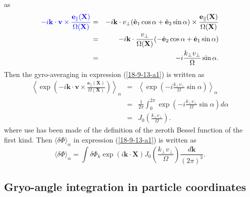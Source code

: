 \documentclass{article}
\newcommand{\tmcolor}[2]{{\color{#1}{#2}}}
\begin{document}
as
\begin{eqnarray}
  \tmcolor{blue}{- i\mathbf{k} \cdot \mathbf{v} \times
  \frac{\mathbf{e}_{\parallel} (\mathbf{X})}{\Omega (\mathbf{X})}} & = & -
  i\mathbf{k} \cdot v_{\perp} (\hat{\mathbf{e}}_1 \cos \alpha +
  \hat{\mathbf{e}}_2 \sin \alpha) \times \frac{\mathbf{e}_{\parallel}
  (\mathbf{X})}{\Omega (\mathbf{X})} \nonumber\\
  & = & - i\mathbf{k} \cdot \frac{v_{\perp}}{\Omega (\mathbf{X})} (-
  \hat{\mathbf{e}}_2 \cos \alpha + \hat{\mathbf{e}}_1 \sin \alpha) \nonumber\\
  & = & - i \frac{k_{\perp} v_{\perp}}{\Omega} \sin \alpha . 
  \label{18-9-12-e6}
\end{eqnarray}
Then the gyro-averaging in expression (\ref{18-9-13-a1}) is written as
\begin{eqnarray}
  \left\langle \exp \left( - i\mathbf{k} \cdot \mathbf{v} \times
  \frac{\mathbf{e}_{\parallel} (\mathbf{X})}{\Omega (\mathbf{X})} \right)
  \right\rangle_{\alpha} & = & \left\langle \exp \left( - i \frac{k_{\perp}
  v_{\perp}}{\Omega} \sin \alpha \right) \right\rangle_{\alpha} \nonumber\\
  & = & \frac{1}{2 \pi} \int_0^{2 \pi} \exp \left( - i \frac{k_{\perp}
  v_{\perp}}{\Omega} \sin \alpha \right) d \alpha \nonumber\\
  & = & J_0 \left( \frac{k_{\perp} v_{\perp}}{\Omega} \right) . 
\end{eqnarray}
where use has been made of the definition of the zeroth Bessel function of the
first kind. Then $\langle \delta \Phi \rangle_{\alpha}$ in expression
(\ref{18-9-13-a1}) is written as
\begin{equation}
  \label{18-9-12-e1} \langle \delta \Phi \rangle_{\alpha} = \int \delta \Phi_k
  \exp (i\mathbf{k} \cdot \mathbf{X}) J_0 \left( \frac{k_{\perp}
  v_{\perp}}{\Omega} \right) \frac{d\mathbf{k}}{(2 \pi)^3} .
\end{equation}

\subsection{Gryo-angle integration in particle coordinates}
\end{document}
